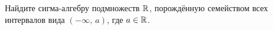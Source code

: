 \begin{task}{6}
    Найдите сигма-алгебру подмножеств $\mathbb{R}$, порождённую семейством всех интервалов вида $(-\infty,\, a)$,
    где $a\in\mathbb{R}$.
\end{task}

